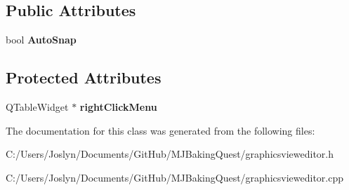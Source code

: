 \subsection*{Public Attributes}
\begin{DoxyCompactItemize}
\item 
\hypertarget{class_graphics_view_editor_a30d6a7e9b7771e24efbc7e7235b84f08}{bool {\bfseries Auto\-Snap}}\label{class_graphics_view_editor_a30d6a7e9b7771e24efbc7e7235b84f08}

\end{DoxyCompactItemize}
\subsection*{Protected Attributes}
\begin{DoxyCompactItemize}
\item 
\hypertarget{class_graphics_view_editor_ab055e6d90b676077fb391545245aa694}{Q\-Table\-Widget $\ast$ {\bfseries right\-Click\-Menu}}\label{class_graphics_view_editor_ab055e6d90b676077fb391545245aa694}

\end{DoxyCompactItemize}


The documentation for this class was generated from the following files\-:\begin{DoxyCompactItemize}
\item 
C\-:/\-Users/\-Joslyn/\-Documents/\-Git\-Hub/\-M\-J\-Baking\-Quest/graphicsvieweditor.\-h\item 
C\-:/\-Users/\-Joslyn/\-Documents/\-Git\-Hub/\-M\-J\-Baking\-Quest/graphicsvieweditor.\-cpp\end{DoxyCompactItemize}
